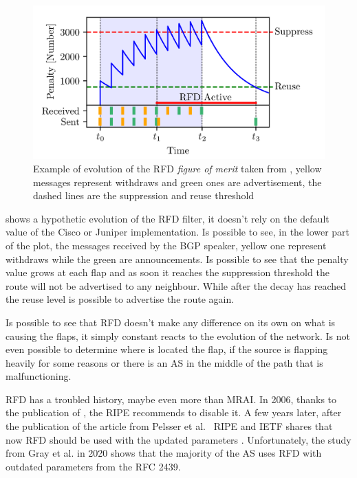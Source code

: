 \begin{figure}[ht]
    \centering
    \includegraphics[scale=0.22]{images/RFD/evolution.png}
	\caption{Example of evolution of the \ac{RFD} \textit{figure of merit} taken
	from \cite{gray2020bgp}, yellow messages represent withdraws and green ones
	are advertisement, the dashed lines are the suppression and reuse threshold}
    \label{fig:figure_of_merit}
\end{figure}

 shows a hypothetic evolution of the \ac{RFD} filter,
it doesn't rely on the default value of the Cisco or Juniper implementation.
Is possible to see, in the lower part of the plot, the messages received by the
\ac{BGP} speaker, yellow one represent withdraws while the green are announcements.
Is possible to see that the penalty value grows at each flap and as soon it reaches
the suppression threshold the route will not be advertised to any neighbour.
While after the decay has reached the reuse level is possible to advertise the
route again.

Is possible to see that \ac{RFD} doesn't make any difference on its own on what
is causing the flaps, it simply constant reacts to the evolution of the network.
Is not even possible to determine where is located the flap, if the source
is flapping heavily for some reasons or there is an \ac{AS} in the middle of the
path that is malfunctioning.

\ac{RFD} has a troubled history, maybe even more than \ac{MRAI}.
In \num{2006}, thanks to the publication of \cite{mao2002route}, the \ac{RIPE}
recommends to disable it\cite{smith2006ripe}.
A few years later, after the publication of the article from Pelsser et al.~\cite{pelsser2011route}
\ac{RIPE} and \ac{IETF} shares that now \ac{RFD} should be used with the updated
parameters \cite{bush2013ripe,rfc7196}.
Unfortunately, the study from Gray et al. \cite{gray2020bgp} in \num{2020} shows
that the majority of the \ac{AS} uses \ac{RFD} with outdated parameters
from the \ac{RFC} \num{2439}.


